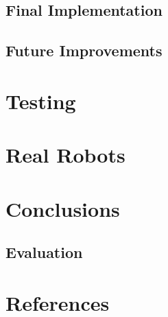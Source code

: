 \documentclass[a4paper,12pt]{article}
\begin{document}
\subsection{Final Implementation}
\subsection{Future Improvements} %
\section{Testing}
\section{Real Robots}
\section{Conclusions}
\subsection{Evaluation}
\section{References}



\end{document}
